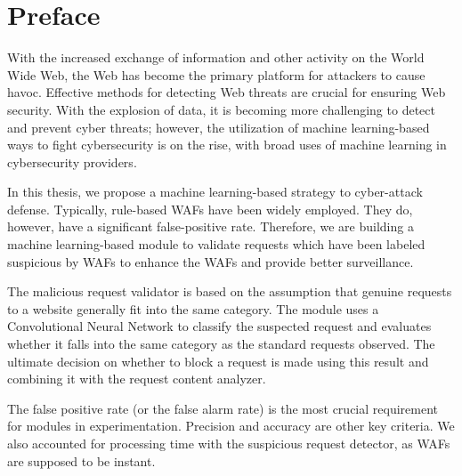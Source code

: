 \chapter*{Preface}
\thispagestyle{fancy}
\label{tom_tat}
\hspace*{5cm}

With the increased exchange of information and other activity on the World Wide Web, the Web has become the primary platform for attackers to cause havoc. Effective methods for detecting Web threats are crucial for ensuring Web security. With the explosion of data, it is becoming more challenging to detect and prevent cyber threats; however, the utilization of machine learning-based ways to fight cybersecurity is on the rise, with broad uses of machine learning in cybersecurity providers. 

In this thesis, we propose a machine learning-based strategy to cyber-attack defense. Typically, rule-based WAFs have been widely employed. They do, however, have a significant false-positive rate. Therefore, we are building a machine learning-based module to validate requests which have been labeled suspicious by WAFs to enhance the WAFs and provide better surveillance. 

The malicious request validator is based on the assumption that genuine requests to a website generally fit into the same category. The module uses a Convolutional Neural Network to classify the suspected request and evaluates whether it falls into the same category as the standard requests observed. The ultimate decision on whether to block a request is made using this result and combining it with the request content analyzer.


The false positive rate (or the false alarm rate) is the most crucial requirement for modules in experimentation. Precision and accuracy are other key criteria. We also accounted for processing time with the suspicious request detector, as WAFs are supposed to be instant.
	
\cleardoublepage
